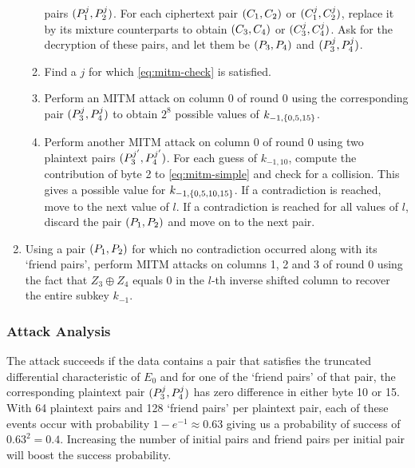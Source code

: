 \documentclass[twoside]{article}
\begin{document}
\begin{enumerate}
\begin{enumerate}
        pairs \((P_1^j, P_2^j)\). For each ciphertext pair \((C_1,
        C_2)\) or \((C_1^j, C_2^j)\), replace it by its mixture
        counterparts to obtain \((C_3, C_4)\) or \((C_3^j, C_4^j)\).
        Ask for the decryption of these pairs, and let them be \((P_3,
        P_4)\) and \((P_3^j, P_4^j)\).
        \item Find a \(j\) for which \eqref{eq:mitm-check} is satisfied.
        \item Perform an MITM attack on column 0 of round 0 using the
        corresponding pair \((P_3^j, P_4^j)\) to obtain \(2^8\) possible
        values of \(k_{-1, \{0, 5, 15\}}\).
        \item Perform another MITM attack on column 0 of round 0 using two
        plaintext pairs \((P_3^{j^\prime}, P_4^{j^\prime})\). For each
        guess of \(k_{-1, 10}\), compute the contribution of byte 2 to
        \eqref{eq:mitm-simple} and check for a collision. This gives a possible
        value for \(k_{-1, \{0, 5, 10, 15\}}\). If a contradiction is
        reached, move to the next value of \(l\). If a contradiction is reached
        for all values of \(l\), discard the pair \((P_1, P_2)\) and move
        on to the next pair.
    \end{enumerate}
    \item Using a pair \((P_1, P_2)\) for which no contradiction occurred
    along with its `friend pairs', perform MITM attacks on columns 1, 2 and 3 of
    round 0 using the fact that \(Z_3 \oplus Z_4\) equals 0 in the \(l\)-th
    inverse shifted column to recover the entire subkey \(k_{-1}\). 
\end{enumerate}

\subsubsection{Attack Analysis}
The attack succeeds if the data contains a pair that satisfies the truncated
differential characteristic of \(E_0\) and for one of the `friend pairs' of that
pair, the corresponding plaintext pair \((P_3^j, P_4^j)\) has zero
difference in either byte 10 or 15. With 64 plaintext pairs and 128 `friend
pairs' per plaintext pair, each of these events occur with probability \(1 -
e^{-1} \approx 0.63\) giving us a probability of success of \(0.63^2 = 0.4\).
Increasing the number of initial pairs and friend pairs per initial pair will
boost the success probability.
\end{document}
